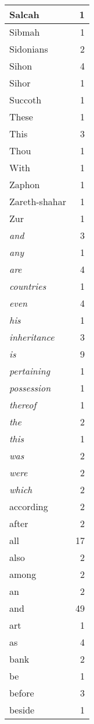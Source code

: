\begin{center}
\begin{longtable}{l|r}
Salcah & 1\\ \hline 
Sibmah & 1\\ \hline 
Sidonians & 2\\ \hline 
Sihon & 4\\ \hline 
Sihor & 1\\ \hline 
Succoth & 1\\ \hline 
These & 1\\ \hline 
This & 3\\ \hline 
Thou & 1\\ \hline 
With & 1\\ \hline 
Zaphon & 1\\ \hline 
Zareth-shahar & 1\\ \hline 
Zur & 1\\ \hline 
\emph{and} & 3\\ \hline 
\emph{any} & 1\\ \hline 
\emph{are} & 4\\ \hline 
\emph{countries} & 1\\ \hline 
\emph{even} & 4\\ \hline 
\emph{his} & 1\\ \hline 
\emph{inheritance} & 3\\ \hline 
\emph{is} & 9\\ \hline 
\emph{pertaining} & 1\\ \hline 
\emph{possession} & 1\\ \hline 
\emph{thereof} & 1\\ \hline 
\emph{the} & 2\\ \hline 
\emph{this} & 1\\ \hline 
\emph{was} & 2\\ \hline 
\emph{were} & 2\\ \hline 
\emph{which} & 2\\ \hline 
according & 2\\ \hline 
after & 2\\ \hline 
all & 17\\ \hline 
also & 2\\ \hline 
among & 2\\ \hline 
an & 2\\ \hline 
and & 49\\ \hline 
art & 1\\ \hline 
as & 4\\ \hline 
bank & 2\\ \hline 
be & 1\\ \hline 
before & 3\\ \hline 
beside & 1\\ \hline 

\end{longtable}
\end{center}
